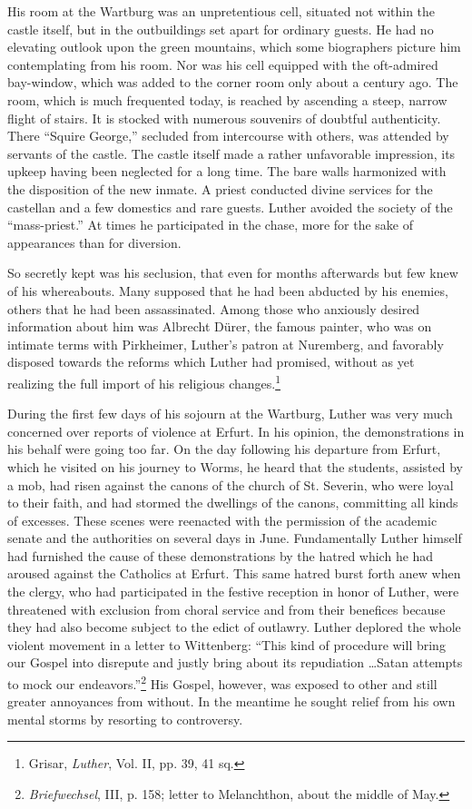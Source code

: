 His room at the Wartburg was an unpretentious cell, situated not
within the castle itself, but in the outbuildings set apart for ordinary
guests. He had no elevating outlook upon the green mountains,
which some biographers picture him contemplating from his room.
Nor was his cell equipped with the oft-admired bay-window, which
was added to the corner room only about a century ago. The room,
which is much frequented today, is reached by ascending a steep,
narrow flight of stairs. It is stocked with numerous souvenirs of
doubtful authenticity. There “Squire George,” secluded from intercourse
with others, was attended by servants of the castle. The castle
itself made a rather unfavorable impression, its upkeep having
been neglected for a long time. The bare walls harmonized with the
disposition of the new inmate. A priest conducted divine services for
the castellan and a few domestics and rare guests. Luther avoided the
society of the “mass-priest.” At times he participated in the chase,
more for the sake of appearances than for diversion.

So secretly kept was his seclusion, that even for months afterwards
but few knew of his whereabouts. Many supposed that he had been
abducted by his enemies, others that he had been assassinated. Among
those who anxiously desired information about him was Albrecht
Dürer, the famous painter, who was on intimate terms with Pirkheimer,
Luther’s patron at Nuremberg, and favorably disposed
towards the reforms which Luther had promised, without as yet
realizing the full import of his religious changes.\footnote{Grisar, \textit{Luther}, Vol. II, pp. 39, 41 sq.}

During the first few days of his sojourn at the Wartburg, Luther
was very much concerned over reports of violence at Erfurt. In
his opinion, the demonstrations in his behalf were going too far. On
the day following his departure from Erfurt, which he visited on
his journey to Worms, he heard that the students, assisted by a mob,
had risen against the canons of the church of St. Severin, who
were loyal to their faith, and had stormed the dwellings of the
canons, committing all kinds of excesses. These scenes were reenacted
with the permission of the academic senate and the authorities on
several days in June. Fundamentally Luther himself had furnished
the cause of these demonstrations by the hatred which he had
aroused against the Catholics at Erfurt. This same hatred burst
forth anew when the clergy, who had participated in the festive
reception in honor of Luther, were threatened with exclusion from
choral service and from their benefices because they had also become
subject to the edict of outlawry. Luther deplored the whole violent
movement in a letter to Wittenberg: “This kind of procedure will
bring our Gospel into disrepute and justly bring about its repudiation \dots Satan
attempts to mock our endeavors.”\footnote
{\textit{Briefwechsel}, III, p. 158; letter to Melanchthon, about the middle of May.}
His Gospel,
however, was exposed to other and still greater annoyances from
without. In the meantime he sought relief from his own mental
storms by resorting to controversy.

